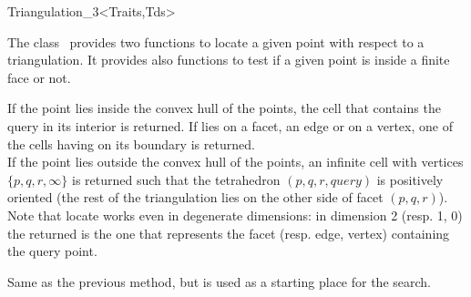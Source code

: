 \begin{ccClassTemplate}{Triangulation_3<Traits,Tds>}

The class \ccClassTemplateName\  provides two functions to locate
a given point with respect to a triangulation. It provides
also functions to test if a given point is inside a finite face
or not.

{
If the point  lies inside the convex hull of the points, the cell 
that contains the query in its interior is returned. If  lies on a
facet, an edge or on a vertex, one of the cells having  on
its boundary is returned.\\ 
If the point  lies outside the convex hull of the points,
an infinite cell with vertices $\{ p, q, r, \infty\}$ is returned such that
the tetrahedron $( p, q, r, query )$ is positively oriented
(the rest of the triangulation lies on the other side of facet 
$( p, q, r )$). \\
Note that locate works even in degenerate dimensions: in dimension 2
(resp. 1, 0) the  returned is the one that represents
the facet (resp. edge, vertex) containing the query point.
}

{Same as the previous method, but  is used as a starting
place for the search.}


\end{ccClassTemplate}
